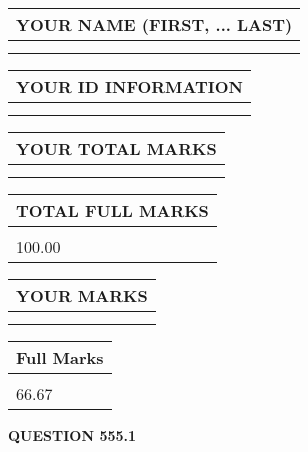 \documentclass{ctexart}
\begin{document}
   
   
   
\newpage 
\setcounter{page}{ 
   555001 } 
   
   
   
   
\noindent\begin{tabular}{|l|}
\hline
YOUR NAME (FIRST, ... LAST)  \\
\hline
 \\ 
 \\ 
\hline
\end{tabular}
\hspace{0.05in} \begin{tabular}{|l|}
\hline
 YOUR   ID   INFORMATION  \\
\hline
 \\ 
 \\ 
\hline
\end{tabular}
   
   
\vspace{0.2in}\noindent\begin{tabular}{|l|}
\hline
YOUR TOTAL MARKS  \\
\hline
 \\ 
 \\ 
\hline
\end{tabular}
\hspace{0.05in} \begin{tabular}{|l|}
\hline
TOTAL FULL MARKS  \\
\hline
 \\ 
100.00 \\
\hline
\end{tabular}
   
   
 \vspace{0.2in}
 
 
 
 
   
   
  
\vspace{0.2in}
  
\noindent\begin{tabular}{|l|}
\hline
 YOUR MARKS  \\
\hline
 \\ 
 \\ 
\hline
\end{tabular}
\hspace{0.05in} \begin{tabular}{|l|}
\hline
 Full Marks  \\
\hline
 \\ 
66.67 \\
\hline
\end{tabular}
{\textbf{\Large{QUESTION
555.1 
}}}
  
\end{document}
